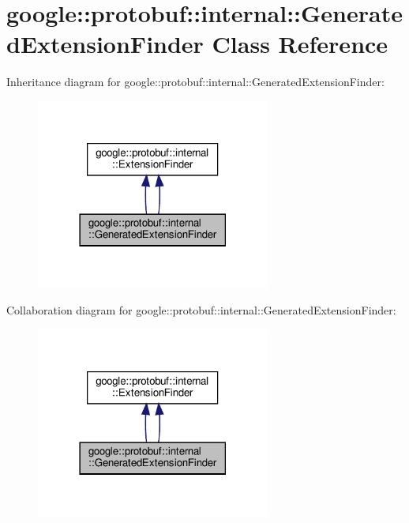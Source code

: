 \hypertarget{classgoogle_1_1protobuf_1_1internal_1_1GeneratedExtensionFinder}{}\section{google\+:\+:protobuf\+:\+:internal\+:\+:Generated\+Extension\+Finder Class Reference}
\label{classgoogle_1_1protobuf_1_1internal_1_1GeneratedExtensionFinder}


Inheritance diagram for google\+:\+:protobuf\+:\+:internal\+:\+:Generated\+Extension\+Finder\+:
\nopagebreak
\begin{figure}[H]
\begin{center}
\leavevmode
\includegraphics[width=218pt]{classgoogle_1_1protobuf_1_1internal_1_1GeneratedExtensionFinder__inherit__graph}
\end{center}
\end{figure}


Collaboration diagram for google\+:\+:protobuf\+:\+:internal\+:\+:Generated\+Extension\+Finder\+:
\nopagebreak
\begin{figure}[H]
\begin{center}
\leavevmode
\includegraphics[width=218pt]{classgoogle_1_1protobuf_1_1internal_1_1GeneratedExtensionFinder__coll__graph}
\end{center}
\end{figure}
